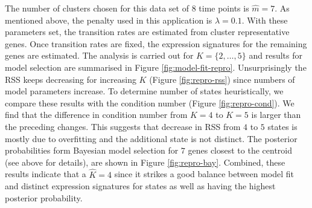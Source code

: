 The number of clusters chosen for this data set of $8$ time points is $\hat{m} = 7$. As mentioned above, the penalty used in this application is $\lambda = 0.1$. With these parameters set, the transition rates are estimated from cluster representative genes. Once transition rates are fixed, the expression signatures for the remaining genes are estimated. The analysis is carried out for $K = \lbrace 2, \ldots, 5 \rbrace $ and results for model selection are summarised in Figure \ref{fig:model-fit-repro}. Unsurprisingly the RSS keeps decreasing for increasing $K$ (Figure \ref{fig:repro-rss}) since numbers of model parameters increase. To determine number of states heuristically, we compare these results with the condition number (Figure \ref{fig:repro-cond}). We find that the difference in condition number from $K=4$ to $K=5$ is larger than the preceding changes. This suggests that decrease in RSS from $4$ to $5$ states is mostly due to overfitting and the additional state is not distinct. The posterior probabilities form Bayesian model selection for $7$  genes closest to the centroid (see above for details), are shown in Figure \ref{fig:repro-bay}. Combined, these results indicate that a $\hat{K} = 4$ since it strikes a good balance between model fit and distinct expression signatures for states as well as having the highest posterior probability.

